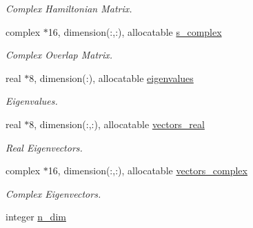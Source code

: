 \begin{DoxyCompactItemize}
\begin{DoxyCompactList}\small\item\em Complex Hamiltonian Matrix. \end{DoxyCompactList}\item 
\hypertarget{namespaceelsi_a420c35eb06860bbb101e042dde751254}{}complex $\ast$16, dimension(\+:,\+:), allocatable \hyperlink{namespaceelsi_a420c35eb06860bbb101e042dde751254}{s\+\_\+complex}\label{namespaceelsi_a420c35eb06860bbb101e042dde751254}

\begin{DoxyCompactList}\small\item\em Complex Overlap Matrix. \end{DoxyCompactList}\item 
\hypertarget{namespaceelsi_aed3c85f67b6805b3de83c43140712d7a}{}real $\ast$8, dimension(\+:), allocatable \hyperlink{namespaceelsi_aed3c85f67b6805b3de83c43140712d7a}{eigenvalues}\label{namespaceelsi_aed3c85f67b6805b3de83c43140712d7a}

\begin{DoxyCompactList}\small\item\em Eigenvalues. \end{DoxyCompactList}\item 
\hypertarget{namespaceelsi_a75d2ea4793597648c8466c4f8510a2f8}{}real $\ast$8, dimension(\+:,\+:), allocatable \hyperlink{namespaceelsi_a75d2ea4793597648c8466c4f8510a2f8}{vectors\+\_\+real}\label{namespaceelsi_a75d2ea4793597648c8466c4f8510a2f8}

\begin{DoxyCompactList}\small\item\em Real Eigenvectors. \end{DoxyCompactList}\item 
\hypertarget{namespaceelsi_ade72ed826776968c28d6406936b5c912}{}complex $\ast$16, dimension(\+:,\+:), allocatable \hyperlink{namespaceelsi_ade72ed826776968c28d6406936b5c912}{vectors\+\_\+complex}\label{namespaceelsi_ade72ed826776968c28d6406936b5c912}

\begin{DoxyCompactList}\small\item\em Complex Eigenvectors. \end{DoxyCompactList}\item 
\hypertarget{namespaceelsi_a6fe4260e151d1c07f4658f0712102cbb}{}integer \hyperlink{namespaceelsi_a6fe4260e151d1c07f4658f0712102cbb}{n\+\_\+dim}\label{namespaceelsi_a6fe4260e151d1c07f4658f0712102cbb}


\end{DoxyCompactItemize}
